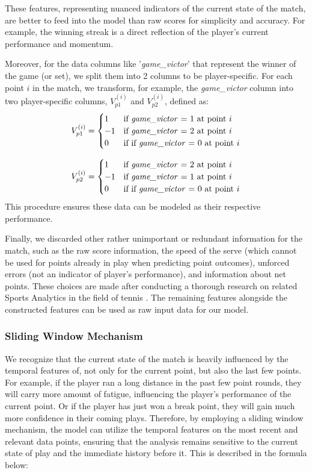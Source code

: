 \documentclass[12pt]{article}  %
\begin{document}
These features, representing nuanced indicators of the current state of the match, are better to feed into the model than raw scores for simplicity and accuracy. For example, the winning streak is a direct reflection of the player's current performance and momentum.

Moreover, for the data columns like '\textit{game\_victor}' that represent the winner of the game (or set), we split them into 2 columns to be player-specific. For each point \( i \) in the match, we transform, for example, the \textit{game\_victor} column into two player-specific columns, \( V_{p1}^{(i)} \) and \( V_{p2}^{(i)} \), defined as:
\[
V_{p1}^{(i)} = 
\begin{cases} 
	1 & \text{if \textit{game\_victor} = 1 at point } i  \\
	-1 & \text{if \textit{game\_victor} = 2 at point } i \\
	0 & \text{if if \textit{game\_victor} = 0 at point } i
\end{cases}
\]

\[
V_{p2}^{(i)} = 
\begin{cases} 
	1 & \text{if \textit{game\_victor} = 2 at point } i \\
	-1 & \text{if \textit{game\_victor} = 1 at point } i \\
	0 & \text{if if \textit{game\_victor} = 0 at point } i
\end{cases}
\]
This procedure ensures these data can be modeled as their respective performance.  

Finally, we discarded other rather unimportant or redundant information for the match, such as the raw score information, the speed of the serve (which cannot be used for points already in play when predicting point outcomes), unforced errors (not an indicator of player's performance), and information about net points. These choices are made after conducting a thorough research on related Sports Analytics in the field of tennis \cite{2}\cite{3}\cite{4}. The remaining features alongside the constructed features can be used as raw input data for our model.

\subsubsection{Sliding Window Mechanism}
We recognize that the current state of the match is heavily influenced by the temporal features of, not only for the current point, but also the last few points. For example, if the player ran a long distance in the past few point rounds, they will carry more amount of fatigue, influencing the player's performance of the current point. Or if the player has just won a break point, they will gain much more confidence in their coming plays. Therefore, by employing a sliding window mechanism, the model can utilize the temporal features on the most recent and relevant data points, ensuring that the analysis remains sensitive to the current state of play and the immediate history before it. This is described in the formula below:
\end{document}
